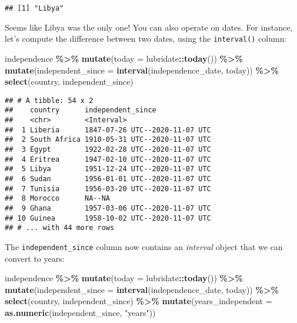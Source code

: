\documentclass[
]{article}
\newenvironment{Shaded}{\begin{snugshade}}{\end{snugshade}}
\newcommand{\DataTypeTok}[1]{\textcolor[rgb]{0.13,0.29,0.53}{#1}}
\newcommand{\KeywordTok}[1]{\textcolor[rgb]{0.13,0.29,0.53}{\textbf{#1}}}
\newcommand{\NormalTok}[1]{#1}
\newcommand{\OperatorTok}[1]{\textcolor[rgb]{0.81,0.36,0.00}{\textbf{#1}}}
\newcommand{\StringTok}[1]{\textcolor[rgb]{0.31,0.60,0.02}{#1}}
\begin{document}
\begin{verbatim}
## [1] "Libya"
\end{verbatim}

Seems like Libya was the only one! You can also operate on dates. For instance, let's compute the difference between
two dates, using the \texttt{interval()} column:

\begin{Shaded}
\begin{Highlighting}[]
\NormalTok{independence }\OperatorTok{\%\textgreater{}\%}
\StringTok{  }\KeywordTok{mutate}\NormalTok{(}\DataTypeTok{today =}\NormalTok{ lubridate}\OperatorTok{::}\KeywordTok{today}\NormalTok{()) }\OperatorTok{\%\textgreater{}\%}
\StringTok{  }\KeywordTok{mutate}\NormalTok{(}\DataTypeTok{independent\_since =} \KeywordTok{interval}\NormalTok{(independence\_date, today)) }\OperatorTok{\%\textgreater{}\%}
\StringTok{  }\KeywordTok{select}\NormalTok{(country, independent\_since)}
\end{Highlighting}
\end{Shaded}

\begin{verbatim}
## # A tibble: 54 x 2
##    country      independent_since             
##    <chr>        <Interval>                    
##  1 Liberia      1847-07-26 UTC--2020-11-07 UTC
##  2 South Africa 1910-05-31 UTC--2020-11-07 UTC
##  3 Egypt        1922-02-28 UTC--2020-11-07 UTC
##  4 Eritrea      1947-02-10 UTC--2020-11-07 UTC
##  5 Libya        1951-12-24 UTC--2020-11-07 UTC
##  6 Sudan        1956-01-01 UTC--2020-11-07 UTC
##  7 Tunisia      1956-03-20 UTC--2020-11-07 UTC
##  8 Morocco      NA--NA                        
##  9 Ghana        1957-03-06 UTC--2020-11-07 UTC
## 10 Guinea       1958-10-02 UTC--2020-11-07 UTC
## # ... with 44 more rows
\end{verbatim}

The \texttt{independent\_since} column now contains an \emph{interval} object that we can convert to years:

\begin{Shaded}
\begin{Highlighting}[]
\NormalTok{independence }\OperatorTok{\%\textgreater{}\%}
\StringTok{  }\KeywordTok{mutate}\NormalTok{(}\DataTypeTok{today =}\NormalTok{ lubridate}\OperatorTok{::}\KeywordTok{today}\NormalTok{()) }\OperatorTok{\%\textgreater{}\%}
\StringTok{  }\KeywordTok{mutate}\NormalTok{(}\DataTypeTok{independent\_since =} \KeywordTok{interval}\NormalTok{(independence\_date, today)) }\OperatorTok{\%\textgreater{}\%}
\StringTok{  }\KeywordTok{select}\NormalTok{(country, independent\_since) }\OperatorTok{\%\textgreater{}\%}
\StringTok{  }\KeywordTok{mutate}\NormalTok{(}\DataTypeTok{years\_independent =} \KeywordTok{as.numeric}\NormalTok{(independent\_since, }\StringTok{"years"}\NormalTok{))}
\end{Highlighting}
\end{Shaded}
\end{document}
